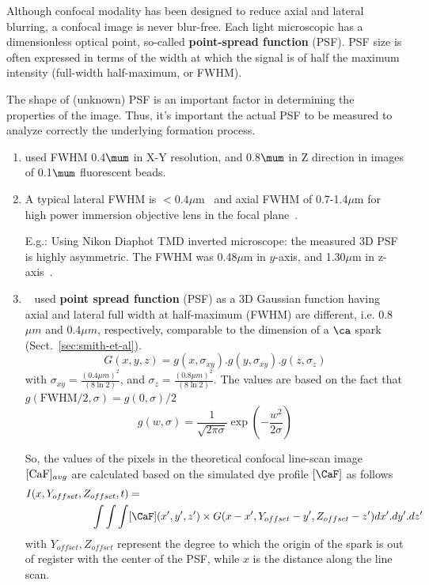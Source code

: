 Although confocal modality has been designed to reduce axial and
lateral blurring, a confocal image is never blur-free. Each light
microscopic has a dimensionless optical point, so-called
{\bf point-spread function} (PSF).  PSF size is often expressed in
terms of the width at which the signal is of half the maximum
intensity (full-width half-maximum, or FWHM).

The shape of (unknown) PSF is an important factor in determining the
properties of the image. Thus, it's important the actual PSF to be
measured to analyze correctly the underlying formation process.
\begin{enumerate}
\item \citep{cheng1996csc} used FWHM 0.4$\mum$ in X-Y resolution, and 0.8$\mum$
in Z direction in images of 0.1$\mum$ fluorescent beads.

\item A typical lateral FWHM is $<0.4\mu$m~\citep{parker1997} and
  axial FWHM of 0.7-1.4$\mu$m for high power immersion objective lens
  in the focal plane~\citep{pratusevich1996}.

  E.g.: Using Nikon Diaphot TMD inverted microscope: the measured 3D
  PSF is highly asymmetric. The FWHM was 0.48$\mu$m in $y$-axis, and
  1.30$\mu$m in z-axis~\citep{pratusevich1996}.

\item ~\citep{smith1998} used {\bf point spread function} (PSF) as a
  3D Gaussian function having axial and lateral full width at
  half-maximum (FWHM) are different, i.e. 0.8$\mu m$ and $0.4\mu m$,
  respectively, comparable to the dimension of a $\ca$ spark
  (Sect.~\ref{sec:smith-et-al}).
  \begin{equation}
    \label{eq:971}
    G(x,y,z) = g(x,\sigma_{xy}).g(y,\sigma_{xy}).g(z,\sigma_{z})
  \end{equation}
  with $\sigma_{xy}=\frac{(0.4\mu m)^2}{(8 \ln2)}$, and $\sigma_z = \frac{(0.8\mu
    m)^2}{(8\ln2)}$. The values are based on the fact that $g(\text{FWHM}/2,\sigma)=g(0,\sigma)/2$
  \begin{equation}
    \label{eq:972}
    g(w,\sigma) = \frac{1}{\sqrt{2\pi\sigma}}\exp(-\frac{w^2}{2\sigma})
  \end{equation}


  So, the values of the pixels in the theoretical confocal line-scan
  image $[\ce{CaF}]_{avg}$ are calculated based on the simulated dye
  profile $[\CaF]$ as follows
  \begin{equation}
    \label{eq:970}
    \begin{split}
      I(x,Y_{offset},Z_{offset},t) &%
      = \\
      \int\int\int &[\CaF](x',y',z')\times G(x-x',Y_{offset}-y',
      Z_{offset}-z')dx'.dy'.dz'
    \end{split}
  \end{equation}
  with $Y_{offset},Z_{offset}$ represent the degree to which the origin
  of the spark is out of register with the center of the PSF, while $x$
  is the distance along the line scan.


\end{enumerate}
